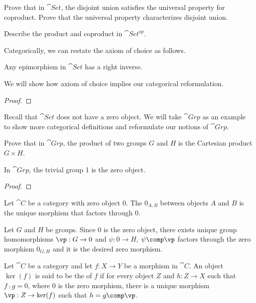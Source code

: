 \documentclass[10pt]{article}
\begin{document}
\begin{problem}
    Prove that in $\cat{Set}$, the disjoint union satisfies the universal property for coproduct. Prove that the universal property characterizes disjoint union.
\end{problem}
\begin{problem}
    Describe the product and coproduct in $\cat{{Set}^{op}}$. 
\end{problem}
\par
Categorically, we can restate the axiom of choice as follows.
\begin{Axiom of choice}
    Any epimorphism in $\cat{Set}$ has a right inverse.
\end{Axiom of choice}
\par
We will show how axiom of choice implies our categorical reformulation.
\begin{proof}
    
\end{proof}
\par
Recall that $\cat{Set}$ does not have a zero object. We will take $\cat{Grp}$ as an example to show more categorical definitions and reformulate our notions of $\cat{Grp}$.
\begin{problem}
    Prove that in $\cat{Grp}$, the product of two groups $G$ and $H$ is the Cartesian product $G\times H$.
\end{problem}
\begin{proposition}
    In $\cat{Grp}$, the trivial group 1 is the zero object.
\end{proposition}
\begin{proof}
    
\end{proof}
\begin{definition}
    Let $\cat{C}$ be a category with zero object 0. The  ${0}_{A,B}$ between objects $A$ and $B$ is the unique morphism that factors through 0.
\end{definition}
\par
Let $G$ and $H$ be groups. Since $0$ is the zero object, there exists unique group homomorphisms $\vp:G\to 0$ and $\psi:0\to H$, $\psi\comp\vp$ factors through the zero morphism ${0}_{G,H}$ and it is the desired zero morphism.
\begin{definition}
    Let $\cat{C}$ be a category and let $f:X\to Y$ be a morphism in $\cat{C}$. An object $\ker(f)$ is said to be the  of $f$ if for every object $Z$ and $h:Z\to X$ such that $f\comp g=0$, where $0$ is the zero morphism, there is a unique morphism $\vp:Z\to\ker(f)$ such that $h=g\comp\vp$.
\end{definition}
\end{document}

